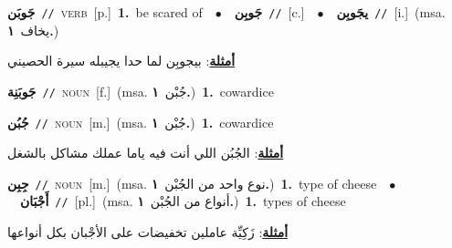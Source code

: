 \documentclass[10pt,a4paper,twoside]{article} %
\begin{document}
\begin{multicols}{2}
{\setlength\topsep{0pt}\textbf{\foreignlanguage{arabic}{جَوبَن}}\ {\color{gray}\texttt{//}\color{black}}\ \textsc{verb}\ [p.]\ \textbf{1.}~be scared of\ \ $\bullet$\ \ \setlength\topsep{0pt}\textbf{\foreignlanguage{arabic}{جَوبِن}}\ {\color{gray}\texttt{//}\color{black}}\ [c.]\ \ $\bullet$\ \ \setlength\topsep{0pt}\textbf{\foreignlanguage{arabic}{يجَوبِن}}\ {\color{gray}\texttt{//}\color{black}}\ [i.]\ \color{gray}(msa. \foreignlanguage{arabic}{يخاف}~\foreignlanguage{arabic}{\textbf{١.}})\color{black}\  \begin{flushright}\color{gray}\foreignlanguage{arabic}{\textbf{\underline{\foreignlanguage{arabic}{أمثلة}}}: بيجوبِن لما حدا يجيبله سيرة الحصيني}\end{flushright}\color{black}} \vspace{2mm}

{\setlength\topsep{0pt}\textbf{\foreignlanguage{arabic}{جَوبَنِة}}\ {\color{gray}\texttt{//}\color{black}}\ \textsc{noun}\ [f.]\ \color{gray}(msa. \foreignlanguage{arabic}{جُبْن}~\foreignlanguage{arabic}{\textbf{١.}})\color{black}\ \textbf{1.}~cowardice\ } \vspace{2mm}

{\setlength\topsep{0pt}\textbf{\foreignlanguage{arabic}{جُبُن}}\ {\color{gray}\texttt{//}\color{black}}\ \textsc{noun}\ [m.]\ \color{gray}(msa. \foreignlanguage{arabic}{جُبْن}~\foreignlanguage{arabic}{\textbf{١.}})\color{black}\ \textbf{1.}~cowardice\  \begin{flushright}\color{gray}\foreignlanguage{arabic}{\textbf{\underline{\foreignlanguage{arabic}{أمثلة}}}: الجُبُن اللي أنت فيه ياما عملك مشاكل بالشغل}\end{flushright}\color{black}} \vspace{2mm}

{\setlength\topsep{0pt}\textbf{\foreignlanguage{arabic}{جِبِن}}\ {\color{gray}\texttt{//}\color{black}}\ \textsc{noun}\ [m.]\ \color{gray}(msa. \foreignlanguage{arabic}{نوع واحد من الجُبْن}~\foreignlanguage{arabic}{\textbf{١.}})\color{black}\ \textbf{1.}~type of cheese\ \ $\bullet$\ \ \setlength\topsep{0pt}\textbf{\foreignlanguage{arabic}{أَجْبَان}}\ {\color{gray}\texttt{//}\color{black}}\ [pl.]\ \color{gray}(msa. \foreignlanguage{arabic}{أنواع من الجُبْن}~\foreignlanguage{arabic}{\textbf{١.}})\color{black}\ \textbf{1.}~types of cheese\  \begin{flushright}\color{gray}\foreignlanguage{arabic}{\textbf{\underline{\foreignlanguage{arabic}{أمثلة}}}: زَكِيِّة عاملين تخفيضات على الأجْبان بكل أنواعها}\end{flushright}\color{black}} \vspace{2mm}


\end{multicols}
\end{document}
